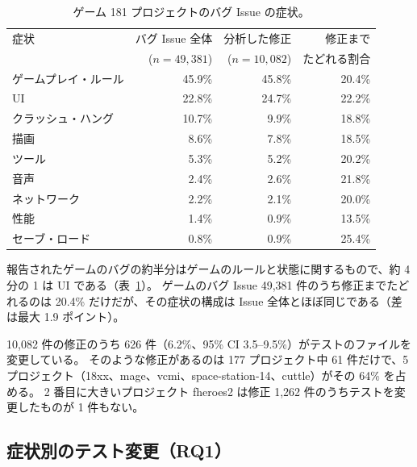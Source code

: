 \documentclass[a4paper,twocolumn,9pt]{ltjsarticle}
\begin{document}
\begin{table}[htbp]
\centering
\caption{ゲーム 181 プロジェクトのバグ Issue の症状。}\label{tab:dist}
\footnotesize
\begin{tabular}{@{}lrrr@{}}
\toprule
症状 & バグ Issue 全体 & 分析した修正 & 修正まで\\
 & ($n=49{,}381$) & ($n=10{,}082$) & たどれる割合\\
\midrule
ゲームプレイ・ルール & 45.9\% & 45.8\% & 20.4\%\\
UI & 22.8\% & 24.7\% & 22.2\%\\
クラッシュ・ハング & 10.7\% & 9.9\% & 18.8\%\\
描画 & 8.6\% & 7.8\% & 18.5\%\\
ツール & 5.3\% & 5.2\% & 20.2\%\\
音声 & 2.4\% & 2.6\% & 21.8\%\\
ネットワーク & 2.2\% & 2.1\% & 20.0\%\\
性能 & 1.4\% & 0.9\% & 13.5\%\\
セーブ・ロード & 0.8\% & 0.9\% & 25.4\%\\
\bottomrule
\end{tabular}
\end{table}

報告されたゲームのバグの約半分はゲームのルールと状態に関するもので、約 4 分の 1 は UI である（表~\ref{tab:dist}）。
ゲームのバグ Issue 49,381 件のうち修正までたどれるのは 20.4\% だけだが、その症状の構成は Issue 全体とほぼ同じである（差は最大 1.9 ポイント）。

10,082 件の修正のうち 626 件（6.2\%、95\% CI 3.5--9.5\%）がテストのファイルを変更している。
そのような修正があるのは 177 プロジェクト中 61 件だけで、5 プロジェクト（18xx、mage、vcmi、space-station-14、cuttle）がその 64\% を占める。
2 番目に大きいプロジェクト fheroes2 は修正 1,262 件のうちテストを変更したものが 1 件もない。

\subsection{症状別のテスト変更（RQ1）}\label{sec:rq1}
\end{document}
